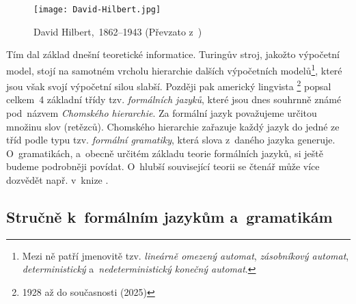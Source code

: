 \begin{figure}[h]
    \centering
    \texttt{[image: David-Hilbert.jpg]}
    \caption[David Hilbert,~1862--1943]{David Hilbert,~1862--1943 (Převzato z~\cite{OConnorHilbert2025})}
    \label{fig:david-hilbert}
\end{figure}
Tím dal základ dnešní teoretické informatice. Turingův stroj, jakožto výpočetní model, stojí na samotném vrcholu hierarchie dalších výpočetních modelů\footnote{Mezi ně patří jmenovitě tzv. \textit{lineárně omezený automat}, \emph{zásobníkový automat}, \emph{deterministický} a~\emph{nedeterministický konečný automat}.}, které jsou však svojí výpočetní silou slabší. Později pak americký lingvista \footnote{1928 až do současnosti (2025)} popsal celkem~4 základní třídy tzv. \emph{formálních jazyků}, které jsou dnes souhrnně známé pod~názvem \emph{Chomského hierarchie}. Za formální jazyk považujeme určitou množinu slov (retězců). Chomského hierarchie zařazuje každý jazyk do jedné ze tříd podle typu tzv. \emph{formální gramatiky}, která slova z~daného jazyka generuje. O~gramatikách, a~obecně určitém základu teorie formálních jazyků, si ještě budeme podrobněji povídat. O~hlubší související teorii se čtenář může více dozvědět např. v~knize \cite{Motwani2003}.

\subsection{Stručně k~formálním jazykům a~gramatikám}\label{subsec:formalni-jazyky-a-gramatiky}

